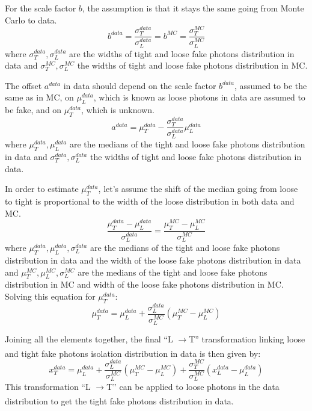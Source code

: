 For the scale factor $b$, the assumption is that it stays the same going from Monte Carlo to data. 
\begin{equation}
     b^{data} = \frac{\sigma_T^{data}}{\sigma_L^{data}} = b^{MC} = \frac{\sigma_T^{MC}}{\sigma_L^{MC}}
     \label{eq: sigma}
\end{equation}
where $\sigma_T^{data}, \sigma_L^{data}$ are the widths of tight and loose fake photons distribution in data and $\sigma_T^{MC}, \sigma_L^{MC}$ the widths of tight and loose fake photons distribution in MC. 

The offset $a^{data}$ in data should depend on the scale factor $b^{data}$, assumed to be the same as in MC, on $\mu_L^{data}$, which is known as loose photons in data are assumed to be fake, and on $\mu_T^{data}$, which is unknown. 
    \begin{equation}
        a^{data} = \mu_T^{data}  - \frac{\sigma_T^{data}}{\sigma_L^{data}} \mu_L^{data}
    \end{equation}
 where $\mu_T^{data}, \mu_L^{data}$ are the medians of the tight and loose fake photons distribution in data and $\sigma_T^{data}, \sigma_L^{data}$ the widths of tight and loose fake photons distribution in data. 
 
    In order to estimate $\mu_T^{data}$, let's assume the shift of the median going from loose to tight is proportional to the width of the loose distribution in both data and MC. 
      \begin{equation}
        \frac{\mu_T^{data} -\mu_L^{data}}{\sigma_L^{data}} =   \frac{\mu_T^{MC} - \mu_L^{MC}}{\sigma_L^{MC}} 
    \end{equation}
where $\mu_T^{data}, \mu_L^{data}, \sigma_L^{data}$ are the medians of the tight and loose fake photons distribution in data and the width of the loose fake photons distribution in data and $\mu_T^{MC}, \mu_L^{MC}, \sigma_L^{MC}$ are the medians of the tight and loose fake photons distribution in MC and width of the loose fake photons distribution in MC. Solving this equation for $\mu_T^{data}$:  
    \begin{equation}
        \mu_T^{data} = \mu_L^{data} +  \frac{\sigma_L^{data}}{\sigma_L^{MC}} (\mu_T^{MC} - \mu_L^{MC} ) 
        \label{eq: mean}
    \end{equation}

Joining all the elements together, the final  \enquote{L $\xrightarrow[]{}$T} transformation linking loose and tight fake photons isolation distribution in data is then given by: 
\begin{equation}
    x_T^{data} =  \mu_L^{data} +  \frac{\sigma_L^{data}}{\sigma_L^{MC}} (\mu_T^{MC} - \mu_L^{MC} )  +  \frac{\sigma_T^{MC}}{\sigma_L^{MC}} (x_L^{data} - \mu_L^{data} ) 
\end{equation}
This transformation \enquote{L $\xrightarrow[]{}$T} can be applied to loose photons in the data distribution to get the tight fake photons distribution in data. 

